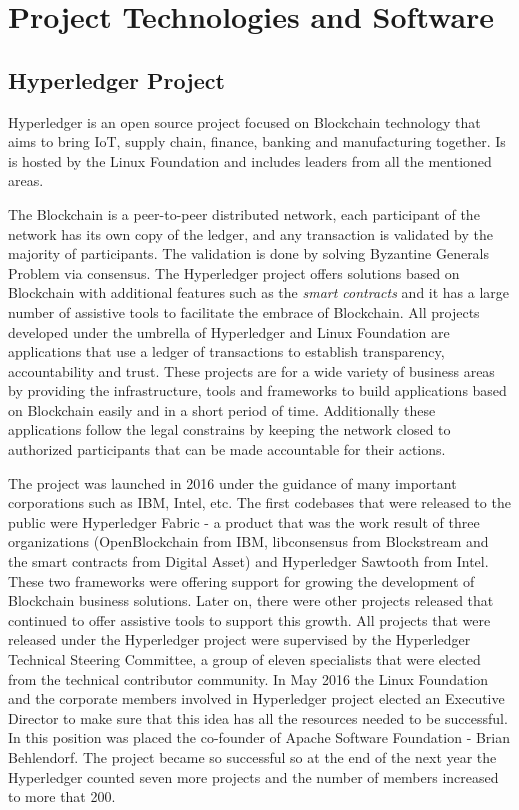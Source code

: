 \chapter{Project Technologies and Software}
\label{chapter:chapter2}

\section{Hyperledger Project}
\label{sub-sec:chapter1-section1}
Hyperledger is an open source project focused on Blockchain technology that aims to bring IoT, supply chain, finance, banking and manufacturing together. Is is hosted by the Linux Foundation and includes leaders from all the mentioned areas.

The Blockchain is a peer-to-peer distributed network, each participant of the network has its own copy of the ledger, and any transaction is validated by the majority of participants. The validation is done by solving Byzantine Generals Problem via consensus.
The Hyperledger project offers solutions based on Blockchain with additional features such as the \emph{smart contracts} and it has a large number of assistive tools to facilitate the embrace of Blockchain.
All projects developed under the umbrella of Hyperledger and Linux Foundation are applications that use a ledger of transactions to establish transparency, accountability and trust. These projects are for a wide variety of business areas by providing the infrastructure, tools and frameworks to build applications based on Blockchain easily and in a short period of time. Additionally these applications follow the legal constrains by keeping the network closed to authorized participants that can be made accountable for their actions.

The project was launched in 2016 under the guidance of many important corporations such as IBM, Intel, etc. The first codebases that were released to the public were Hyperledger Fabric - a product that was the work result of three organizations (OpenBlockchain from IBM, libconsensus from Blockstream and the smart contracts from Digital Asset) and Hyperledger Sawtooth from Intel. 
These two frameworks were offering support for growing the development of Blockchain business solutions. Later on, there were other projects released that continued to offer assistive tools to support this growth. All projects that were released under the Hyperledger project were supervised by the Hyperledger Technical Steering Committee, a group of eleven specialists that were elected from the technical contributor community.
In May 2016 the Linux Foundation and the corporate members involved in Hyperledger project elected an Executive Director to make sure that this idea has all the resources needed to be successful. In this position was placed the co-founder of Apache Software Foundation - Brian Behlendorf. 
The project became so successful so at the end of the next year the Hyperledger counted seven more projects and the number of members increased to more that 200.

